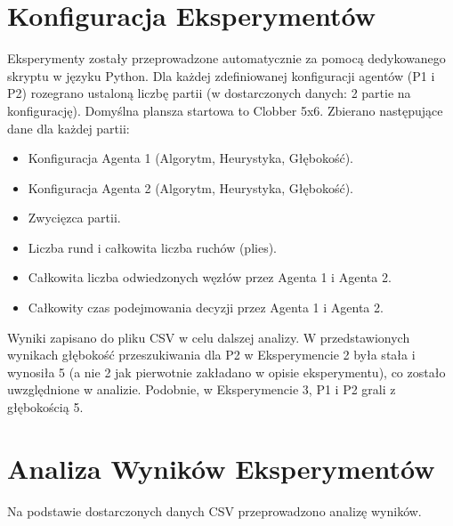 \documentclass[11pt,a4paper]{article}
\begin{document}
\section{Konfiguracja Eksperymentów}
Eksperymenty zostały przeprowadzone automatycznie za pomocą dedykowanego skryptu w języku Python. Dla każdej zdefiniowanej konfiguracji agentów (P1 i P2) rozegrano ustaloną liczbę partii (w dostarczonych danych: 2 partie na konfigurację). Domyślna plansza startowa to Clobber 5x6.
Zbierano następujące dane dla każdej partii:
\begin{itemize}
    \item Konfiguracja Agenta 1 (Algorytm, Heurystyka, Głębokość).
    \item Konfiguracja Agenta 2 (Algorytm, Heurystyka, Głębokość).
    \item Zwycięzca partii.
    \item Liczba rund i całkowita liczba ruchów (plies).
    \item Całkowita liczba odwiedzonych węzłów przez Agenta 1 i Agenta 2.
    \item Całkowity czas podejmowania decyzji przez Agenta 1 i Agenta 2.
\end{itemize}
Wyniki zapisano do pliku CSV w celu dalszej analizy. W przedstawionych wynikach głębokość przeszukiwania dla P2 w Eksperymencie 2 była stała i wynosiła 5 (a nie 2 jak pierwotnie zakładano w opisie eksperymentu), co zostało uwzględnione w analizie. Podobnie, w Eksperymencie 3, P1 i P2 grali z głębokością 5.

\section{Analiza Wyników Eksperymentów}
Na podstawie dostarczonych danych CSV przeprowadzono analizę wyników.
\end{document}
